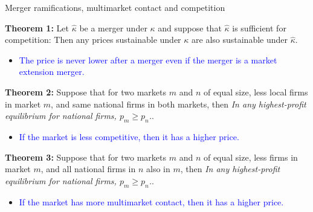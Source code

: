 \documentclass[notes,10.2pt, aspectratio=169]{beamer}
\newenvironment{wideitemize}{\itemize\addtolength{\itemsep}{10pt}}{\enditemize}
\begin{document}
\begin{frame}{Merger ramifications, multimarket contact and competition}



  \begin{wideitemize}

  \item \textbf{Theorem 1:} Let $\hat{\kappa}$ be a merger under $\kappa$ and suppose that $\hat{\kappa}$ is sufficient for competition: Then any prices sustainable under $\kappa$ are also sustainable under $\hat{\kappa}$.
  \begin{itemize}
  \item \textcolor{blue}{The price is never lower after a merger even if the merger is a market extension merger.} 
  \end{itemize}
  
  \pause 

  \item \textbf{Theorem 2:}  Suppose that for two markets $m$ and $n$ of equal size, less local firms in market $m$, and same national firms in both markets, then 
  \textit{In any highest-profit equilibrium for national firms, $p_m \geq p_n$.}. 
  \begin{itemize}
    \item \textcolor{blue}{ If the market is less competitive, then it has a higher price.} 
    \end{itemize}
    
  \pause 

  \item \textbf{Theorem 3:}  Suppose that for two markets $m$ and $n$ of equal size, less firms in market $m$, and all national firms in $n$ also in $m$, then
  \textit{In any highest-profit equilibrium for national firms, $p_m \geq p_n$.}.
  \begin{itemize}
    \item \textcolor{blue}{ If the market has more multimarket contact, then it has a higher price.} 
    \end{itemize}


\end{wideitemize}
  

\end{frame}
\end{document}
